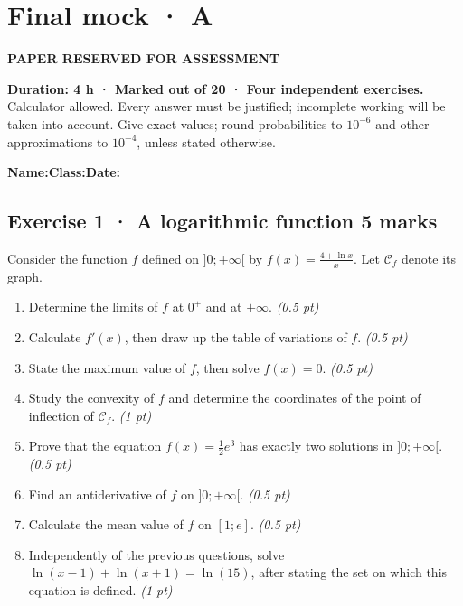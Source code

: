 \fi

\ifprof

\clearpage{}\label{sujet:9-3}

\section*{Final mock · A}

{\sffamily\bfseries\color{amber}PAPER RESERVED FOR ASSESSMENT\par}

\textbf{Duration: 4 h · Marked out of 20 · Four independent exercises.}\\Calculator allowed. Every answer must be justified; incomplete working will be taken into account. Give exact values; round probabilities to $10^{-6}$ and other approximations to $10^{-4}$, unless stated otherwise.

\smallskip\textbf{Name:}\enspace\dotfill\quad\textbf{Class:}\enspace\dotfill\quad\textbf{Date:}\enspace\dotfill

\subsection*{Exercise 1 · A logarithmic function \hfill 5 marks}Consider the function $f$ defined on $]0;+\infty[$ by $f(x)=\frac{4+\ln x}x$. Let $\mathcal C_f$ denote its graph.

\begin{enumerate}

\item Determine the limits of $f$ at $0^+$ and at $+\infty$. \hfill\textit{(0.5 pt)}

\item Calculate $f' (x)$, then draw up the table of variations of $f$. \hfill\textit{(0.5 pt)}

\item State the maximum value of $f$, then solve $f(x)=0$. \hfill\textit{(0.5 pt)}

\item Study the convexity of $f$ and determine the coordinates of the point of inflection of $\mathcal C_f$. \hfill\textit{(1 pt)}

\item Prove that the equation $f(x)=\frac12 e^{3}$ has exactly two solutions in $]0;+\infty[$. \hfill\textit{(0.5 pt)}

\item Find an antiderivative of $f$ on $]0;+\infty[$. \hfill\textit{(0.5 pt)}

\item Calculate the mean value of $f$ on $[1;e]$. \hfill\textit{(0.5 pt)}

\item Independently of the previous questions, solve $\ln(x-1)+\ln(x+1)=\ln(15)$, after stating the set on which this equation is defined. \hfill\textit{(1 pt)}

\end{enumerate}


